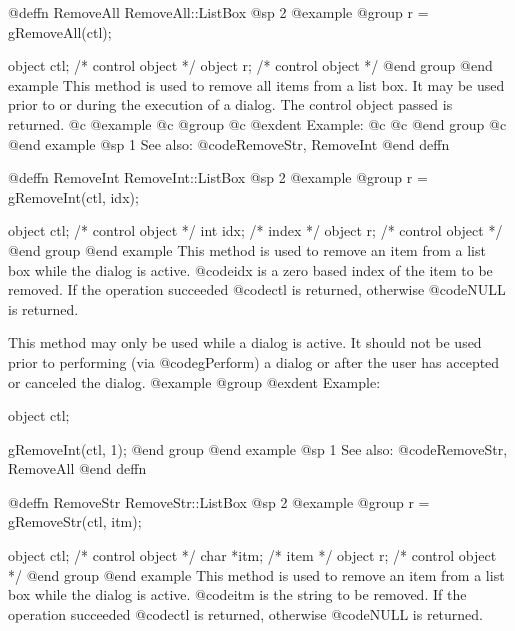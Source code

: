 @deffn {RemoveAll} RemoveAll::ListBox
@sp 2
@example
@group
r = gRemoveAll(ctl);

object  ctl;    /*  control object  */
object  r;      /*  control object  */
@end group
@end example
This method is used to remove all items from a list box.  It may be used
prior to or during the execution of a dialog.  The control object passed
is returned.
@c @example
@c @group
@c @exdent Example:
@c 
@c @end group
@c @end example
@sp 1
See also:  @code{RemoveStr, RemoveInt}
@end deffn
















@deffn {RemoveInt} RemoveInt::ListBox
@sp 2
@example
@group
r = gRemoveInt(ctl, idx);

object  ctl;    /*  control object  */
int     idx;    /*  index           */
object  r;      /*  control object  */
@end group
@end example
This method is used to remove an item from a list box while the dialog
is active.  @code{idx} is a zero based index of the item to be removed.
If the operation succeeded @code{ctl} is returned, otherwise @code{NULL}
is returned.

This method may only be used while a dialog is active.  It should not be
used prior to performing (via @code{gPerform}) a dialog or after the user
has accepted or canceled the dialog.
@example
@group
@exdent Example:

object  ctl;

gRemoveInt(ctl, 1);
@end group
@end example
@sp 1
See also:  @code{RemoveStr, RemoveAll}
@end deffn














@deffn {RemoveStr} RemoveStr::ListBox
@sp 2
@example
@group
r = gRemoveStr(ctl, itm);

object  ctl;    /*  control object  */
char   *itm;    /*  item            */
object  r;      /*  control object  */
@end group
@end example
This method is used to remove an item from a list box while the dialog
is active.  @code{itm} is the string to be removed.
If the operation succeeded @code{ctl} is returned, otherwise @code{NULL}
is returned.

